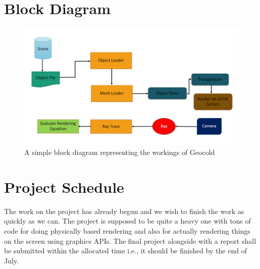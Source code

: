 \documentclass[a4paper, 12pt]{article}
\newcommand\PROJECTNAME{Geocold}
\begin{document}
\section{Block Diagram}
\begin{center}
\begin{figure}[htb]
	\includegraphics[width=1.1\linewidth, scale=1.4]{massivesizedblockD.png}
	\centering
	\caption{A simple block diagram representing the workings of \PROJECTNAME}
	\label{figure:systemblock}
\end{figure}
\end{center}

\section{Project Schedule}
The work on the project has already begun and we 
wish to finish the work as quickly as we can. 
The project is supposed to be quite a heavy one with 
tons of code for doing physically based rendering 
and also for actually rendering things on the 
screen using graphics APIs. The final project alongside
with a report shall be submitted within the 
allocated time i.e., it should be finished by the end of July.

\newpage
\printbibliography
\end{document}
